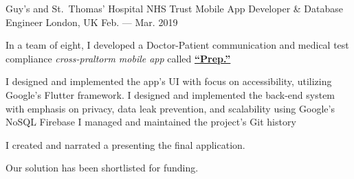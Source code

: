 \begin{cventries}
  \cventry
    {Guy's and St.\ Thomas’ Hospital NHS Trust} %
    {Mobile App Developer \& Database Engineer} %
    {London, UK} %
    {Feb. --- Mar. 2019} %
    {
      \begin{cvitems} %
        \item {In a team of eight, I developed a Doctor-Patient communication and medical test compliance \emph{cross-praltorm mobile app} called \href{https://davzzar.github.io/prep-page/}{\textbf{\uline{``Prep.''}}}}
        \item I designed and implemented the app's UI with focus on accessibility, utilizing Google’s Flutter framework.
        \bsep{} {I designed and implemented the back-end system with emphasis on privacy, data leak prevention, and scalability using Google’s NoSQL Firebase}
        \bsep{} I managed and maintained the project's Git history
        \item {I created and narrated a \href{https://drive.google.com/file/d/1Pu6NSpqPXnWcaanUpIu_gd5C1bQnOyQi/preview}{} presenting the final application.}
        \item {Our solution has been shortlisted for funding.}
      \end{cvitems}
    }

\end{cventries}
